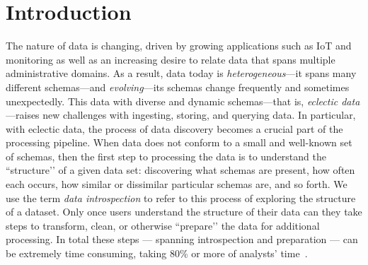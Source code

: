 \vspace{-1em}
\section{Introduction}

The nature of data is changing, driven by growing applications such as IoT and monitoring as well as an increasing desire to relate data that spans multiple administrative domains. As a result, data today is {\em heterogeneous}---it spans many different schemas---and {\em evolving}---its schemas change frequently and sometimes unexpectedly. This data with diverse and dynamic schemas---that is, {\em eclectic data}---raises new challenges with ingesting, storing, and querying data. 
In particular, with eclectic data, the process of data discovery becomes a crucial part of the processing pipeline. When data does not conform to a small and well-known set of schemas, then the first step to processing the data is to understand the ``structure’’ of a given data set: discovering what schemas are present, how often each occurs, how similar or dissimilar particular schemas are, and so forth. We use the term {\em data introspection} to refer to this process of exploring the structure of a dataset. Only once users understand the structure of their data can they take steps to transform, clean, or otherwise ``prepare’’ the data for additional processing. In total these steps —  spanning introspection and preparation — can be extremely time consuming, taking 80\% or more of analysts' time~\cite{civilizer}. 

